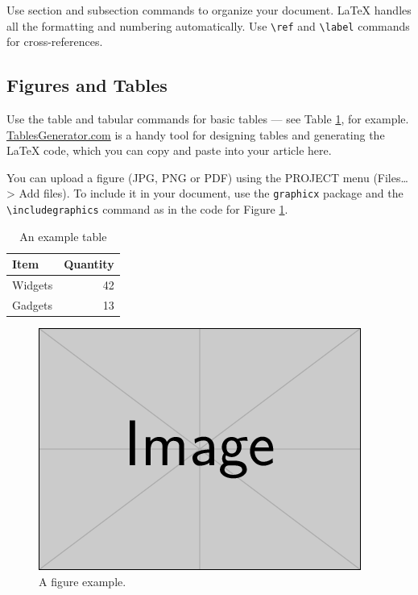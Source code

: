 \documentclass[biblatex,nonblind]{apsr_submission}
\begin{document}
Use section and subsection commands to organize your document. \LaTeX{} handles all the formatting and numbering automatically. Use \verb|\ref| and \verb|\label| commands for cross-references.

\subsection{Figures and Tables}

Use the table and tabular commands for basic tables --- see Table \ref{tab:widgets}, for example. \href{http://tablesgenerator.com}{TablesGenerator.com} is a handy tool for designing tables and generating the  LaTeX code, which you can copy and paste into your article here.

You can upload a figure (JPG, PNG or PDF) using the PROJECT menu (Files\ldots > Add files). To include it in your document, use the \verb|graphicx| package and the \verb|\includegraphics| command as in the code for Figure \ref{fig:view}. 

\begin{table}[hbt!]
\caption{An example table}
\label{tab:widgets}
\centering
\begin{tabular}{lr}
Item & Quantity \\\midrule
Widgets & 42 \\
Gadgets & 13
\end{tabular}
\end{table}

\begin{figure}[hbt!]
\includegraphics[width=\linewidth]{example-image}
\caption{A figure example.}
\label{fig:view}

\end{figure}
\end{document}
